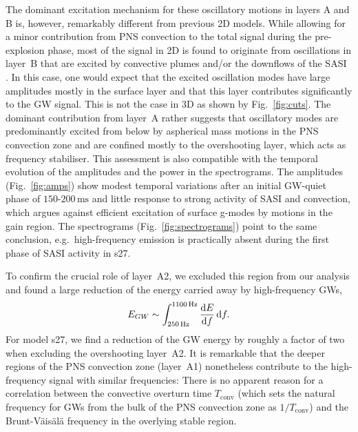 The dominant excitation mechanism for these oscillatory motions in layers A and B is, however,
remarkably different from previous 2D models.
While allowing for a minor contribution from PNS
convection to the total signal during the pre-explosion phase, most of the signal in 2D is
found to originate from oscillations in layer~B that are excited by convective plumes and/or the
downflows of the SASI \citep{marek_08,murphy_09,mueller_13}.
In this case, one would expect that the excited oscillation modes have
large amplitudes mostly in the surface layer and that this layer
contributes significantly to the GW signal. This is not the case in
3D as shown by Fig.~\ref{fig:cuts}.
The dominant contribution from layer~A rather suggests that
oscillatory modes are predominantly excited from below by aspherical mass
motions in the PNS convection zone and are confined mostly to the overshooting layer, which
acts as frequency stabiliser.
{\comment This assessment is also compatible with the temporal
  evolution of the amplitudes and the power in the spectrograms.
  The amplitudes (Fig.~\ref{fig:amps}) show modest
  temporal variations after an initial GW-quiet
  phase of $150 \text{-}200 \, \mathrm{ms}$ and little response
  to strong activity of SASI and convection, which argues
  against efficient excitation of surface g-modes by motions
  in the gain region. The spectrograms
  (Fig.~\ref{fig:spectrograms}) point to the
  same conclusion, e.g.\ high-frequency emission is practically
  absent during the first phase of SASI activity in  s27.}

To confirm the crucial role of layer~A2, we excluded
this region from our analysis and found a large reduction of the
energy carried away by high-frequency GWs,
\begin{equation}
E_{GW} \sim \int_{250 \, \mathrm{Hz}}^{1100\, \mathrm{Hz}} \frac{\mathrm{d} E}{\mathrm{d} f} \, \mathrm{d} f.
\end{equation}
For model s27, we find a reduction of the GW energy
by roughly a factor of two when excluding the overshooting layer~A2. 
It is
remarkable that the deeper regions of the PNS convection zone (layer~A1)
nonetheless contribute to the high-frequency signal with similar
frequencies: There is no apparent reason for a correlation between the
convective overturn time $T_\mathrm{conv}$ (which sets the natural
frequency for GWs from the bulk of the PNS convection zone as
$1/T_\mathrm{conv}$) and the Brunt-V\"{a}is\"{a}l\"{a} frequency in
the overlying stable region.

